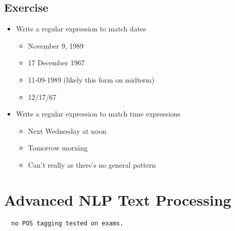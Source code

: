 \documentclass[11pt]{article}
\theoremstyle{definition}
\begin{document}
\subsection{Exercise}
\begin{itemize}
  \item Write a regular expression to match dates
  \begin{itemize}
    \item November 9, 1989
    \item 17 December 1967
    \item 11-09-1989 (likely this form on midterm)
    \item 12/17/67
  \end{itemize}
  \item Write a regular expression to match time expressions
  \begin{itemize}
    \item Next Wednesday at noon
    \item Tomorrow morning
    \item Can't really as there's no general pattern
  \end{itemize}
\end{itemize}

\section{Advanced NLP Text Processing}
\begin{verbatim}
  no POS tagging tested on exams.
\end{verbatim}
\end{document}
